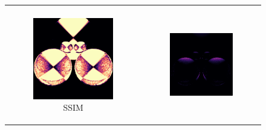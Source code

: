 \begin{figure}[h]
\begin{tabular}{cc}
\begin{subfigure}
			\caption{ART}
		\end{subfigure} \\
		\begin{subfigure}
			{0.4\textwidth}\centering\includegraphics[width=\linewidth]{img/polarizing_spheres.s1_SSIM.png}
			\caption{SSIM}
		\end{subfigure} 
		&
		\begin{subfigure}
			{0.4\textwidth}\centering\includegraphics[width=\linewidth]{img/polarizing_spheres.s1_L1.png}

\end{subfigure}
\end{tabular}
\end{figure}
